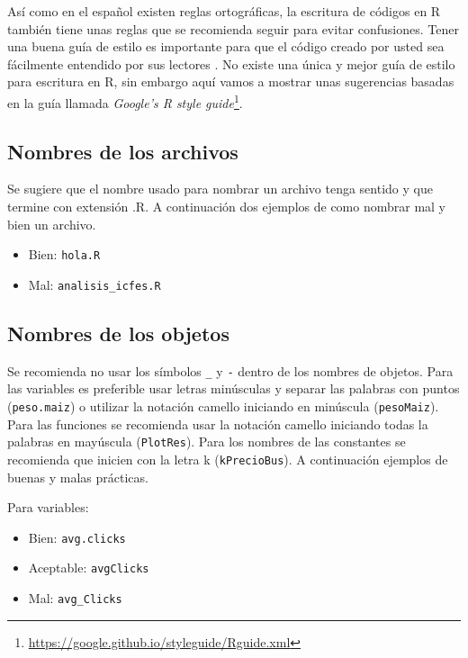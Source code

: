 \documentclass[10pt,]{krantz}
\providecommand{\tightlist}{%
  \setlength{\itemsep}{0pt}\setlength{\parskip}{0pt}}
\let\rmarkdownfootnote\footnote%
\def\footnote{\protect\rmarkdownfootnote}
\renewcommand{\href}[2]{#2\footnote{\url{#1}}}
\begin{document}
Así como en el español existen reglas ortográficas, la escritura de
códigos en R también tiene unas reglas que se recomienda seguir para
evitar confusiones. Tener una buena guía de estilo
 es importante para que el código creado por usted
sea fácilmente entendido por sus lectores \citep{rpackages}. No existe
una única y mejor guía de estilo para escritura en R, sin embargo aquí
vamos a mostrar unas sugerencias basadas en la guía llamada
\href{https://google.github.io/styleguide/Rguide.xml}{\textit{Google's R style guide}}.

\subsection{Nombres de los archivos}\label{nombres-de-los-archivos}

Se sugiere que el nombre usado para nombrar un archivo tenga sentido y
que termine con extensión .R. A continuación dos ejemplos de como
nombrar mal y bien un archivo.

\begin{itemize}
\tightlist
\item
  Bien: \texttt{hola.R}
\item
  Mal: \texttt{analisis\_icfes.R}
\end{itemize}

\subsection{Nombres de los objetos}\label{nombres-de-los-objetos}

Se recomienda no usar los símbolos \texttt{\_} y \texttt{-} dentro de
los nombres de objetos. Para las variables es preferible usar letras
minúsculas y separar las palabras con puntos (\texttt{peso.maiz}) o
utilizar la notación camello iniciando en minúscula (\texttt{pesoMaiz}).
Para las funciones se recomienda usar la notación camello iniciando
todas la palabras en mayúscula (\texttt{PlotRes}). Para los nombres de
las constantes se recomienda que inicien con la letra k
(\texttt{kPrecioBus}). A continuación ejemplos de buenas y malas
prácticas.

Para variables:

\begin{itemize}
    \item Bien: \verb|avg.clicks|
    \item Aceptable: \verb|avgClicks|
    \item Mal: \verb|avg_Clicks|
\end{itemize}
\end{document}
